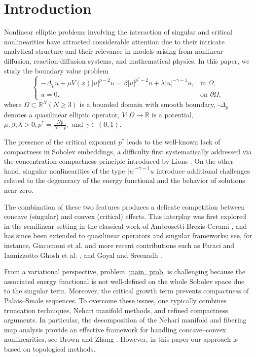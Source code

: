\documentclass[12pt]{extarticle}
\theoremstyle{definition}
\theoremstyle{remark}
\theoremstyle{definition}
\numberwithin{equation}{section}
\numberwithin{equation}{section}
\begin{document}
	
	\section{Introduction}
	Nonlinear elliptic problems involving the interaction of singular and critical nonlinearities have attracted considerable attention due to their intricate analytical structure and their relevance in models arising from nonlinear diffusion, reaction-diffusion systems, and mathematical physics. In this paper, we study the boundary value problem
\[
\begin{cases}\label{main_prob}
-\Delta_{p} u + \mu V(x)|u|^{p-2}u = \beta |u|^{p^*-2}u + \lambda |u|^{-\gamma-1}u, & \text{in } \Omega, \\
u = 0, & \text{on } \partial \Omega,
\end{cases}
\tag{1.1}
\]
where $\Omega \subset \mathbb{R}^N (N \geq 3)$ is a bounded domain with smooth boundary, -$\Delta_{p}$ denotes a quasilinear elliptic operator, $V:\Omega \to \mathbb{R}$ is a potential, $\mu, \beta,\lambda>0, p^* = \frac{Np}{N-p},$ and $\gamma \in (0,1)$.

The presence of the critical exponent $p^*$ leads to the well-known lack of compactness in Sobolev embeddings, a difficulty first systematically addressed via the concentration-compactness principle introduced by Lions \cite{PLL1}. On the other hand, singular nonlinearities of the type $|u|^{-\gamma-1}u$ introduce additional challenges related to the degeneracy of the energy functional and the behavior of solutions near zero.

The combination of these two features produces a delicate competition between concave (singular) and convex (critical) effects. This interplay was first explored in the semilinear setting in the classical work of Ambrosetti-Brezis-Cerami \cite{ACR}, and has since been extended to quasilinear operators and singular frameworks; see, for instance, Giacomoni et al. \cite{GST1} and more recent contributions such as Faraci and Iannizzotto \cite{faraci1} Ghosh et al. \cite{GS2}, and Goyal and Sreenadh \cite{GS1}.

From a variational perspective, problem \eqref{main_prob} is challenging because the associated energy functional
is not well-defined on the whole Sobolev space due to the singular term. Moreover, the critical growth term prevents compactness of Palais–Smale sequences. To overcome these issues, one typically combines truncation techniques, Nehari manifold methods, and refined compactness arguments. In particular, the decomposition of the Nehari manifold and fibering map analysis provide an effective framework for handling concave–convex nonlinearities, see Brown and Zhang \cite{BL1}. However, in this paper our approach is based on topological methods. 
\end{document}
